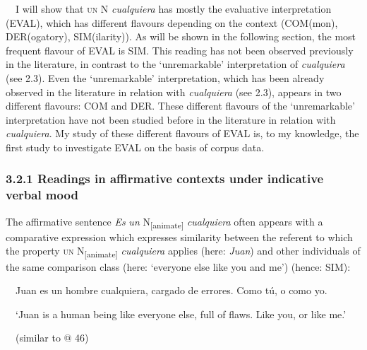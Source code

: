 \begin{styleStandard}
\ \ I will show that \textsc{un} N \textit{cualquiera }has mostly the evaluative interpretation (EVAL), which has different flavours depending on the context (COM(mon), DER(ogatory), SIM(ilarity)). As will be shown in the following section, the most frequent flavour of EVAL is SIM. This reading has not been observed previously in the literature, in contrast to the ‘unremarkable’ interpretation of \textit{cualquiera} (see 2.3). Even the ‘unremarkable’ interpretation, which has been already observed in the literature in relation with \textit{cualquiera} (see 2.3), appears in two different flavours: COM and DER. These different flavours of the ‘unremarkable’ interpretation have not been studied before in the literature in relation with \textit{cualquiera}. My study of these different flavours of EVAL is, to my knowledge, the first study to investigate EVAL on the basis of corpus data.
\end{styleStandard}

\subsubsection[3.2.1 Readings in affirmative contexts under indicative verbal mood]{\textbf{3.2.1 Readings in affirmative contexts under indicative verbal mood}}
\begin{styleStandard}
The affirmative sentence \textit{Es} \textit{un }N\textsubscript{[animate]}\textit{ cualquiera} often appears with a comparative expression which expresses similarity between the referent to which the property \textsc{un }N\textsubscript{[animate]}\textit{ cualquiera} applies (here: \textit{Juan}) and other individuals of the same comparison class (here: ‘everyone else like you and me’) (hence: SIM):
\end{styleStandard}

\begin{styleStandard}
\ \ Juan es un hombre cualquiera, cargado de errores. Como tú, o como yo.
\end{styleStandard}

\begin{styleStandard}
\ \ ‘Juan is a human being like everyone else, full of flaws. Like you, or like me.’
\end{styleStandard}

\begin{styleStandard}
\ \ (similar to @ 46)
\end{styleStandard}

